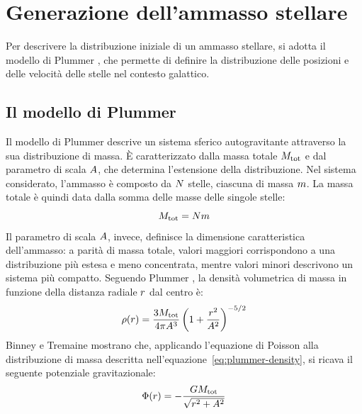 \section{Generazione dell'ammasso stellare}
\label{sec:generazione-ammasso}
Per descrivere la distribuzione iniziale di un ammasso
stellare, si adotta il modello di Plummer \cite{plummer1911},
che permette di definire la distribuzione delle posizioni
e delle velocità delle stelle nel contesto galattico.

\subsection{Il modello di Plummer}
\label{subsec:plummer}
Il modello di Plummer descrive un sistema sferico autogravitante attraverso la sua distribuzione di massa. È caratterizzato dalla massa totale $M_{\mathrm{tot}}$ e dal parametro di scala $A$, che determina l'estensione della distribuzione. Nel sistema considerato, l'ammasso è composto da $N$ stelle, ciascuna di massa $m$. La massa totale è quindi data dalla somma delle masse delle singole stelle:
\begin{equation}
	M_{\mathrm{tot}} = N m
	\label{eq:total-cluster-mass}
\end{equation}
Il parametro di scala $A$, invece, definisce la dimensione caratteristica dell'ammasso: a parità di massa totale, valori maggiori corrispondono a una distribuzione più estesa e meno concentrata, mentre valori minori descrivono un sistema più compatto.
Seguendo Plummer \cite{plummer1911}, la densità volumetrica di massa in funzione della distanza radiale $r$ dal centro è:
\begin{equation}
	\rho(r) =
	\frac{3M_{\mathrm{tot}}}{4\pi A^3}
	\left(1+\frac{r^2}{A^2}\right)^{-5/2}
	\label{eq:plummer-density}
\end{equation}
Binney e Tremaine \cite{binneytremaine2008} mostrano che, applicando l'equazione di Poisson alla distribuzione di massa descritta nell'equazione~\eqref{eq:plummer-density}, si ricava il seguente potenziale gravitazionale:
\begin{equation}
	\Phi(r) =
	-\frac{GM_{\mathrm{tot}}}
	{\sqrt{r^2+A^2}}
	\label{eq:plummer-potential}
\end{equation}
